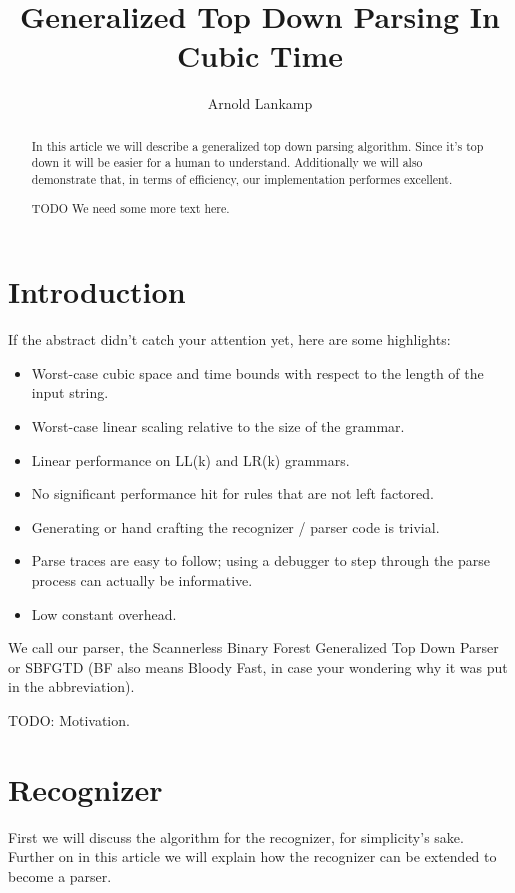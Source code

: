 \documentclass[a4paper,10pt]{article}
\title{Generalized Top Down Parsing In Cubic Time}
\author{Arnold Lankamp}
\begin{document}
\maketitle

\begin{abstract}

In this article we will describe a generalized top down parsing algorithm. Since it's top down it will be easier for a human to understand. Additionally we will also demonstrate that, in terms of efficiency, our implementation performes excellent.

TODO We need some more text here.

\end{abstract}

\section{Introduction}

If the abstract didn't catch your attention yet, here are some highlights:
\begin{itemize}
 \setlength{\itemsep}{0pt}
 \setlength{\parskip}{0pt}
 \setlength{\parsep}{0pt}

 \item Worst-case cubic space and time bounds with respect to the length of the input string.
 \item Worst-case linear scaling relative to the size of the grammar.
 \item Linear performance on LL(k) and LR(k) grammars.
 \item No significant performance hit for rules that are not left factored.
 \item Generating or hand crafting the recognizer / parser code is trivial.
 \item Parse traces are easy to follow; using a debugger to step through the parse process can actually be informative.
 \item Low constant overhead.
\end{itemize}
We call our parser, the Scannerless Binary Forest Generalized Top Down Parser or SBFGTD (BF also means Bloody Fast, in case your wondering why it was put in the abbreviation).

TODO: Motivation.

\section{Recognizer}

First we will discuss the algorithm for the recognizer, for simplicity's sake. Further on in this article we will explain how the recognizer can be extended to become a parser.
\end{document}
